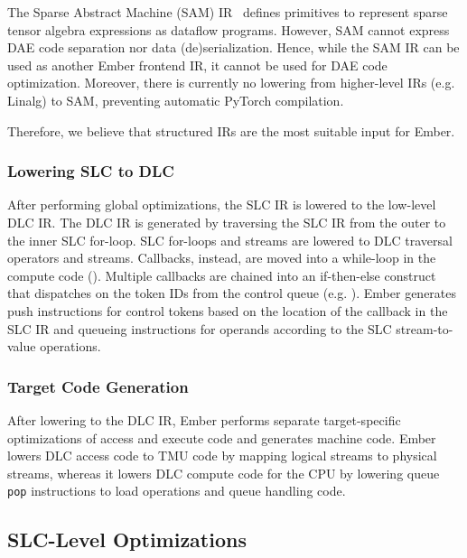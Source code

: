 The Sparse Abstract Machine (SAM) IR~\cite{hsu2023asplos} defines primitives to represent sparse tensor algebra expressions as dataflow programs. However, SAM cannot express DAE code separation nor data (de)serialization. Hence, while the SAM IR can be used as another Ember frontend IR, it cannot be used for DAE code optimization. Moreover, there is currently no lowering from higher-level IRs (e.g. Linalg) to SAM, preventing automatic PyTorch compilation.

Therefore, we believe that structured IRs are the most suitable input for Ember.

\subsubsection{Lowering SLC to DLC} \label{sec:lowering-slc-to-dlc} %

After performing global optimizations, the SLC IR is lowered to the low-level DLC IR. The DLC IR is generated by traversing the SLC IR from the outer to the inner SLC for-loop. SLC for-loops and streams are lowered to DLC traversal operators and streams. Callbacks, instead, are moved into a while-loop in the compute code (). Multiple callbacks are chained into an if-then-else construct that dispatches on the token IDs from the control queue (e.g. ). Ember generates push instructions for control tokens based on the location of the callback in the SLC IR and queueing instructions for operands according to the SLC stream-to-value operations.

\subsubsection{Target Code Generation} \label{sec:target-code-generation} %

After lowering to the DLC IR, Ember performs separate target-specific optimizations of access and execute code and generates machine code. Ember lowers DLC access code to TMU code by mapping logical streams to physical streams, whereas it lowers DLC compute code for the CPU by lowering queue \texttt{pop} instructions to load operations and queue handling code.

\subsection{SLC-Level Optimizations} \label{sec:slc-level-optimizations} %

